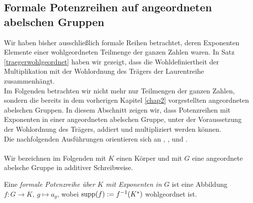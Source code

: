 \subsection{Formale Potenzreihen auf angeordneten abelschen Gruppen}
%
% 
%
%
%
%
Wir haben bisher ausschließlich formale Reihen betrachtet, deren Exponenten Elemente einer wohlgeordneten Teilmenge der ganzen Zahlen waren. In Satz \ref{traegerwohlgeordnet} haben wir gezeigt, dass die Wohldefiniertheit der Multiplikation mit der Wohlordnung des Trägers der Laurentreihe zusammenhängt. \\
Im Folgenden betrachten wir nicht mehr nur Teilmengen der ganzen Zahlen, sondern die bereits in dem vorherigen Kapitel \ref{chap2} vorgestellten angeordneten abelschen Gruppen. In diesem Abschnitt zeigen wir, dass Potenzreihen mit Exponenten in einer angeordneten abelschen Gruppe, unter der Voraussetzung der Wohlordnung des Trägers, addiert und multipliziert werden können.\\  
  Die nachfolgenden Ausführungen orientieren sich an \cite[S. 194 - 199]{fuchs66}, \cite[S. 601 - 655]{hahn07}, \cite[S. 6 - 20]{ucsnay63} und \cite[S. 49 - 64]{priesscrampe83}.\\\\
Wir bezeichnen im Folgenden mit $K$ einen Körper und mit $G$ eine angeordnete abelsche Gruppe in additiver Schreibweise.
%
%
%
%
%
%
\begin{defn}\label{funktionsDefinitionFormalePotenzreihe}
Eine \textit{formale Potenzreihe über $K$ mit Exponenten in $G$} ist eine Abbildung $f\colon G \to K, ~g \mapsto a_g$, wobei $\textup{supp}(f) := f^{-1} (K^*)$ wohlgeordnet ist.
\end{defn}
%
%
%



